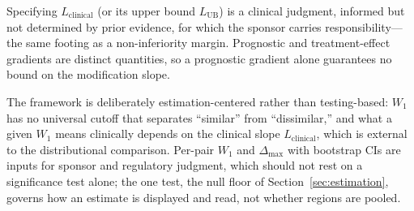 \documentclass[AMA,Times1COL]{WileyNJDv5}
\begin{document}
Specifying $L_{\text{clinical}}$ (or its upper bound $L_{\text{UB}}$) is a clinical judgment, informed but not determined by prior evidence, for which the sponsor carries responsibility---the same footing as a non-inferiority margin. Prognostic and treatment-effect gradients are distinct quantities,\cite{ballman2015,kent2020} so a prognostic gradient alone guarantees no bound on the modification slope.

The framework is deliberately estimation-centered rather than testing-based: $W_1$ has no universal cutoff that separates ``similar'' from ``dissimilar,'' and what a given $W_1$ means clinically depends on the clinical slope $L_{\text{clinical}}$, which is external to the distributional comparison. Per-pair $W_1$ and $\Delta_{\max}$ with bootstrap CIs are inputs for sponsor and regulatory judgment, which should not rest on a significance test alone;\cite{wasserstein2016} the one test, the null floor of Section~\ref{sec:estimation}, governs how an estimate is displayed and read, not whether regions are pooled.
\end{document}
